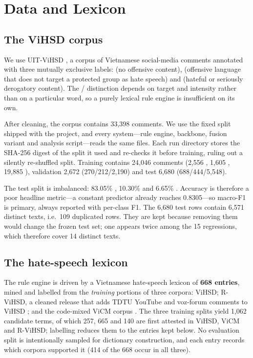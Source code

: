 \section{Data and Lexicon}

\label{sec:data}

\subsection{The ViHSD corpus}

\label{sec:vihsd}

We use UIT-ViHSD \cite{luu2021vihsd}, a corpus of Vietnamese social-media
comments annotated with three mutually exclusive labels: \clean{} (no offensive
content), \off{} (offensive language that does not target a protected group as
hate speech) and \hate{} (hateful or seriously derogatory content). The
\off{}/\hate{} distinction depends on target and intensity rather than on a
particular word, so a purely lexical rule engine is insufficient on its own.

After cleaning, the corpus contains 33{,}398 comments. We use the fixed split
shipped with the project, and every system---rule engine, backbone, fusion
variant and analysis script---reads the same files. Each run directory stores
the SHA-256 digest of the split it used and re-checks it before training,
ruling out a silently re-shuffled split. Training contains 24{,}046 comments
    (2{,}556 \hate{}, 1{,}605 \off{}, 19{,}885 \clean{}), validation 2{,}672
(270/212/2{,}190) and test 6{,}680 (688/444/5{,}548).

The test split is imbalanced: 83.05\% \clean{}, 10.30\% \hate{} and 6.65\%
\off{}. Accuracy is therefore a poor headline metric---a constant \clean{}
predictor already reaches 0.8305---so macro-F1 is primary, always reported with
per-class F1. The 6{,}680 test rows contain 6{,}571 distinct texts, i.e.\ 109
duplicated rows. They are kept because removing them would change the frozen
test set; one appears twice among the 15 regressions, which therefore cover 14
distinct texts.

\subsection{The hate-speech lexicon}

\label{sec:lexicon}

The rule engine is driven by a Vietnamese hate-speech lexicon of \textbf{668
    entries}, mined and labelled from the \emph{training} portions of three
corpora: ViHSD; R-ViHSD, a cleaned release that adds TDTU YouTube and voz-forum
comments to ViHSD \cite{bontoriTdtu}; and the code-mixed ViCM corpus
\cite{nguyen2026vicm}. The three training splits yield 1{,}062 candidate terms,
of which 257, 665 and 140 are first attested in ViHSD, ViCM and R-ViHSD;
labelling reduces them to the entries kept below. No evaluation split is
intentionally sampled for dictionary construction, and each entry records which
corpora supported it (414 of the 668 occur in all three).

